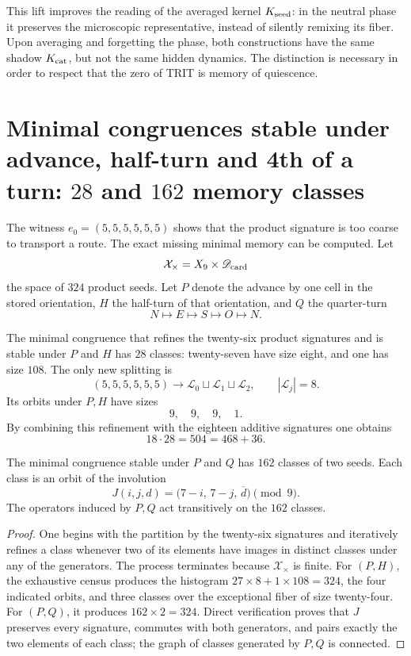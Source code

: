 This lift improves the reading of the averaged kernel \(K_{\rm seed}\): in the neutral phase it preserves the microscopic representative, instead of silently remixing its fiber. Upon averaging and forgetting the phase, both constructions have the same shadow \(K_{\rm cat}\), but not the same hidden dynamics. The distinction is necessary in order to respect that the zero of TRIT is memory of quiescence.

\section{Minimal congruences stable under advance, half-turn and 4th of a turn: \(28\) and \(162\) memory classes}

The witness \(e_0=(5,5,5,5,5,5)\) shows that the product signature is too
coarse to transport a route. The exact missing minimal memory can be
computed. Let
\[
 \mathcal X_\times=X_9\times\mathscr D_{\rm card}
\]
the space of \(324\) product seeds. Let \(P\) denote the advance by one
cell in the stored orientation, \(H\) the half-turn of that
orientation, and \(Q\) the quarter-turn
\[
 N\longmapsto E\longmapsto S\longmapsto O\longmapsto N.
\]

\begin{theorem}
\label{thm:congruencias-avance-giro}
The minimal congruence that refines the twenty-six product signatures and is stable
under \(P\) and \(H\) has \(28\) classes: twenty-seven have size eight, and one
has size \(108\). The only new splitting is
\[
 (5,5,5,5,5,5)\longrightarrow
 \mathcal L_0\sqcup\mathcal L_1\sqcup\mathcal L_2,
 \qquad |\mathcal L_j|=8.
\]
Its orbits under \(P,H\) have sizes
\[
 9,\quad9,\quad9,\quad1.
\]
By combining this refinement with the eighteen additive signatures one obtains
\[
 18\cdot28=504=468+36.
\]

The minimal congruence stable under \(P\) and \(Q\) has \(162\) classes of two
seeds. Each class is an orbit of the involution
\[
 J(i,j,d)=\bigl(7-i,\,7-j,\,\overline d\bigr)\pmod9.
\]
The operators induced by \(P,Q\) act transitively on the
\(162\) classes.
\end{theorem}

\begin{proof}
One begins with the partition by the twenty-six signatures and iteratively refines a class whenever two of its elements have images in distinct classes under any of the generators. The process terminates because \(\mathcal X_\times\) is finite. For \((P,H)\), the exhaustive census produces the histogram \(27\times8+1\times108=324\), the four indicated orbits, and three classes over the exceptional fiber of size twenty-four. For \((P,Q)\), it produces \(162\times2=324\). Direct verification proves that \(J\) preserves every signature, commutes with both generators, and pairs exactly the two elements of each class; the graph of classes generated by \(P,Q\) is connected.
\end{proof}

